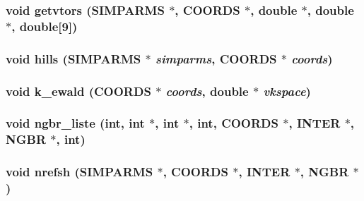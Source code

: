 \subsubsection{\setlength{\rightskip}{0pt plus 5cm}void getvtors ({\bf SIMPARMS} $\ast$, {\bf COORDS} $\ast$, double $\ast$, double $\ast$, double[9])}\label{energy_2proto__energy_8h_88eeb742d73772d936ed57e2fa6fe753}


\subsubsection{\setlength{\rightskip}{0pt plus 5cm}void hills ({\bf SIMPARMS} $\ast$ {\em simparms}, {\bf COORDS} $\ast$ {\em coords})}\label{energy_2proto__energy_8h_31ba0db42c93656d34b74475d6fc2797}


\subsubsection{\setlength{\rightskip}{0pt plus 5cm}void k\_\-ewald ({\bf COORDS} $\ast$ {\em coords}, double $\ast$ {\em vkspace})}\label{energy_2proto__energy_8h_c35c2fd59a5f16e85be95d6ee393e3b1}


\subsubsection{\setlength{\rightskip}{0pt plus 5cm}void ngbr\_\-liste (int, int $\ast$, int $\ast$, int, {\bf COORDS} $\ast$, {\bf INTER} $\ast$, {\bf NGBR} $\ast$, int)}\label{energy_2proto__energy_8h_6f7265abf67049e8e8f8dd28ccfcf4ba}


\subsubsection{\setlength{\rightskip}{0pt plus 5cm}void nrefsh ({\bf SIMPARMS} $\ast$, {\bf COORDS} $\ast$, {\bf INTER} $\ast$, {\bf NGBR} $\ast$)}\label{energy_2proto__energy_8h_0c8408dca8268cb390f590b245a34817}


